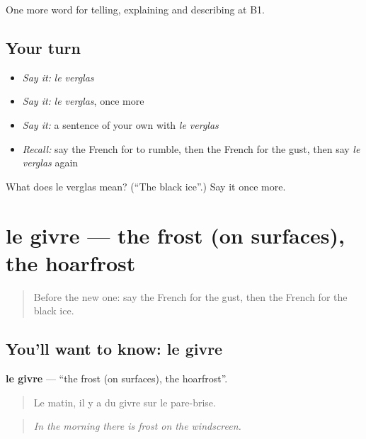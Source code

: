 \begin{grammarlens}[title={What you've built}]
One more word for telling, explaining and describing at B1.
\end{grammarlens}

\subsection*{Your turn}
\begin{itemize}
\raggedright
  \item \emph{Say it:} \emph{le verglas}
  \item \emph{Say it:} \emph{le verglas}, once more
  \item \emph{Say it:} a sentence of your own with \emph{le verglas}
  \item \emph{Recall:} say the French for to rumble, then the French for the gust, then say \emph{le verglas} again
\end{itemize}

\begin{tcolorbox}[breakable,colback=teal!4,colframe=teal!35!black,title={Before you move on}]
What does le verglas mean? (\textquotedblleft{}The black ice\textquotedblright{}.) Say it once more.
\end{tcolorbox}
\section[le givre]{le givre — the frost (on surfaces), the hoarfrost}

\label{lesson:FR-C463-givre}



\begin{quote}
Before the new one: say the French for the gust, then the French for the black ice.
\end{quote}

\subsection*{You'll want to know: le givre}
\textbf{le givre} — \textquotedblleft{}the frost (on surfaces), the hoarfrost\textquotedblright{}.

\begin{quote}
Le matin, il y a du givre sur le pare-brise.
\end{quote}

\begin{quote}
\emph{In the morning there is frost on the windscreen.}
\end{quote}

